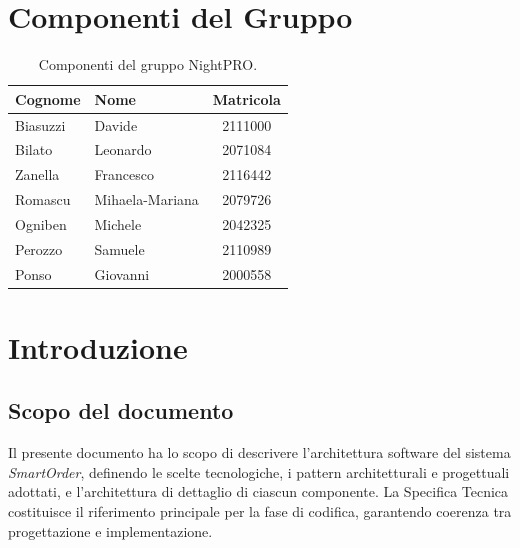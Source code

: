 \documentclass[a4paper, 11pt, oneside]{scrartcl}
\begin{document}
\newpage
\tableofcontents
\listoffigures
\listoftables
\pagestyle{fancy}

\newpage
\section*{Componenti del Gruppo}

\begin{table}[H]
    \centering
    \renewcommand{\arraystretch}{1.2}
    \begin{tabular}{@{}llc@{}}
        \toprule
        \textbf{Cognome} & \textbf{Nome}   & \textbf{Matricola} \\
        \midrule
        Biasuzzi         & Davide          & 2111000            \\
        Bilato           & Leonardo        & 2071084            \\
        Zanella          & Francesco       & 2116442            \\
        Romascu          & Mihaela-Mariana & 2079726            \\
        Ogniben          & Michele         & 2042325            \\
        Perozzo          & Samuele         & 2110989            \\
        Ponso            & Giovanni        & 2000558            \\
        \bottomrule
    \end{tabular}
    \caption{Componenti del gruppo NightPRO.}
\end{table}

\newpage
\section{Introduzione}

\subsection{Scopo del documento}
Il presente documento ha lo scopo di descrivere l'architettura software del sistema \textit{SmartOrder}, definendo le scelte tecnologiche, i pattern architetturali e progettuali adottati, e l'architettura di dettaglio di ciascun componente.
La Specifica Tecnica costituisce il riferimento principale per la fase di codifica, garantendo coerenza tra progettazione e implementazione.
\end{document}
